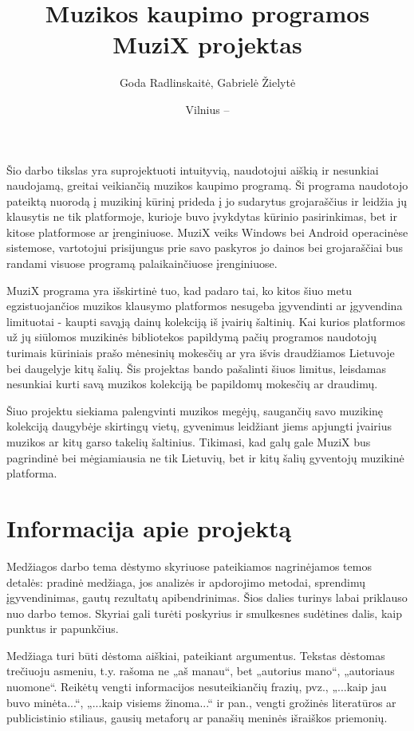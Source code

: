 \documentclass{VUMIFPSkursinis}
\title{Muzikos kaupimo programos MuziX projektas}
\author{Goda Radlinskaitė, Gabrielė Žielytė}
\date{Vilnius – \the\year}
\begin{document}
	
\maketitle
\cleardoublepage{}
\setcounter{page}{2}

\tableofcontents

Šio darbo tikslas yra suprojektuoti intuityvią, naudotojui aiškią ir nesunkiai naudojamą, greitai veikiančią muzikos kaupimo programą. Ši programa naudotojo pateiktą nuorodą į muzikinį kūrinį prideda į jo sudarytus grojaraščius ir leidžia jų klausytis ne tik platformoje, kurioje buvo įvykdytas kūrinio pasirinkimas, bet ir kitose platformose ar įrenginiuose. MuziX veiks Windows bei Android operacinėse sistemose, vartotojui prisijungus prie savo paskyros jo dainos bei grojaraščiai bus randami visuose programą palaikainčiuose įrenginiuose.

MuziX programa yra išskirtinė tuo, kad padaro tai, ko kitos šiuo metu egzistuojančios muzikos klausymo platformos nesugeba įgyvendinti ar įgyvendina limituotai - kaupti savąją dainų kolekciją iš įvairių šaltinių. Kai kurios platformos už jų siūlomos muzikinės bibliotekos papildymą pačių programos naudotojų turimais kūriniais prašo mėnesinių mokesčių ar yra išvis draudžiamos Lietuvoje bei daugelyje kitų šalių. Šis projektas bando pašalinti šiuos limitus, leisdamas nesunkiai kurti savą muzikos kolekciją be papildomų mokesčių ar draudimų.

Šiuo projektu siekiama palengvinti muzikos megėjų, saugančių savo muzikinę kolekciją daugybėje skirtingų vietų, gyvenimus leidžiant jiems apjungti įvairius muzikos ar kitų garso takelių šaltinius. Tikimasi, kad galų gale MuziX bus pagrindinė bei mėgiamiausia ne tik Lietuvių, bet ir kitų šalių gyventojų muzikinė platforma.


\section{Informacija apie projektą}
Medžiagos darbo tema dėstymo skyriuose pateikiamos nagrinėjamos temos detalės:
pradinė medžiaga, jos analizės ir apdorojimo metodai, sprendimų įgyvendinimas,
gautų rezultatų apibendrinimas. Šios dalies turinys labai priklauso nuo darbo
temos. Skyriai gali turėti poskyrius ir smulkesnes sudėtines dalis, kaip
punktus ir papunkčius.

Medžiaga turi būti dėstoma aiškiai, pateikiant argumentus. Tekstas dėstomas
trečiuoju asmeniu, t.y. rašoma ne „aš manau“, bet „autorius mano“, „autoriaus
nuomone“. Reikėtų vengti informacijos nesuteikiančių frazių, pvz., „...kaip jau
buvo minėta...“, „...kaip visiems žinoma...“ ir pan., vengti grožinės literatūros
ar publicistinio stiliaus, gausių metaforų ar panašių meninės išraiškos
priemonių.
\end{document}
